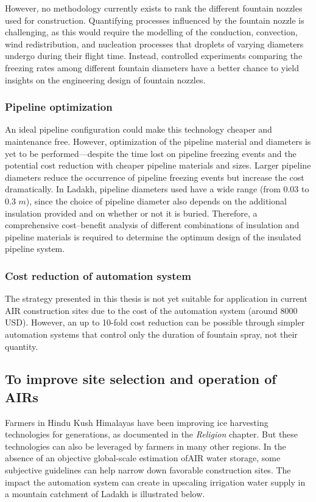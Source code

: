 However, no methodology currently exists to rank the different fountain nozzles used for construction. Quantifying
processes influenced by the fountain nozzle is challenging, as this would require the modelling of the conduction,
convection, wind redistribution, and nucleation processes that droplets of varying diameters undergo during
their flight time. Instead, controlled experiments comparing the freezing rates among different fountain
diameters have a better chance to yield insights on the engineering design of fountain nozzles.

\subsubsection{Pipeline optimization}

An ideal pipeline configuration could make this technology cheaper and maintenance free. However, optimization
of the pipeline material and diameters is yet to be performed---despite the time lost on pipeline freezing
events and the potential cost reduction with cheaper pipeline materials and sizes. Larger pipeline diameters
reduce the occurrence of pipeline freezing events but increase the cost dramatically. In Ladakh, pipeline
diameters used have a wide range (from 0.03 to 0.3 $m$), since the choice of pipeline diameter also depends on
the additional insulation provided and on whether or not it is buried. Therefore, a comprehensive cost--benefit
analysis of different combinations of insulation and pipeline materials is required to determine the optimum
design of the insulated pipeline system.

\subsubsection{Cost reduction of automation system}

The strategy presented in this thesis is not yet suitable for application in current \ac{AIR} construction sites due to the cost of the
automation system (around 8000 USD). However, an up to 10-fold cost reduction can be possible through
simpler automation systems that control only the duration of fountain spray, not their quantity. 

\subsection{To improve site selection and operation of \ac{AIRs} }

Farmers in Hindu Kush Himalayas have been improving ice harvesting technologies for generations, as documented in
the \textit{Religion} chapter. But these technologies can also be leveraged by farmers in many other regions. In
the absence of an objective global-scale estimation of\ac{AIR} water storage, some subjective guidelines
can help narrow down favorable construction sites. The impact the automation system
can create in upscaling irrigation water supply in a mountain catchment of Ladakh is illustrated below.

